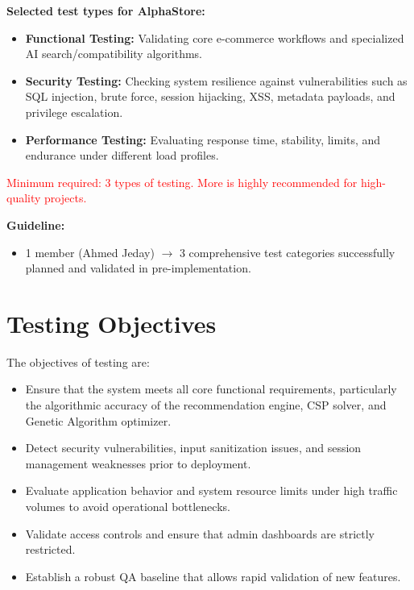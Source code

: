 \documentclass[12pt,a4paper]{article}
\newcommand{\important}[1]{\textcolor{red}{#1}} %
\begin{document}
\textbf{Selected test types for AlphaStore:}
\begin{itemize}
\item \textbf{Functional Testing:} Validating core e-commerce workflows and specialized AI search/compatibility algorithms.
\item \textbf{Security Testing:} Checking system resilience against vulnerabilities such as SQL injection, brute force, session hijacking, XSS, metadata payloads, and privilege escalation.
\item \textbf{Performance Testing:} Evaluating response time, stability, limits, and endurance under different load profiles.
\end{itemize}

\important{Minimum required: 3 types of testing. More is highly recommended for high-quality projects.}

\vspace{0.3cm}

\textbf{Guideline:}
\begin{itemize}
\item 1 member (Ahmed Jeday) $\rightarrow$ 3 comprehensive test categories successfully planned and validated in pre-implementation.
\end{itemize}

\section{Testing Objectives}

The objectives of testing are:

\begin{itemize}
\item Ensure that the system meets all core functional requirements, particularly the algorithmic accuracy of the recommendation engine, CSP solver, and Genetic Algorithm optimizer.
\item Detect security vulnerabilities, input sanitization issues, and session management weaknesses prior to deployment.
\item Evaluate application behavior and system resource limits under high traffic volumes to avoid operational bottlenecks.
\item Validate access controls and ensure that admin dashboards are strictly restricted.
\item Establish a robust QA baseline that allows rapid validation of new features.
\end{itemize}
\end{document}
